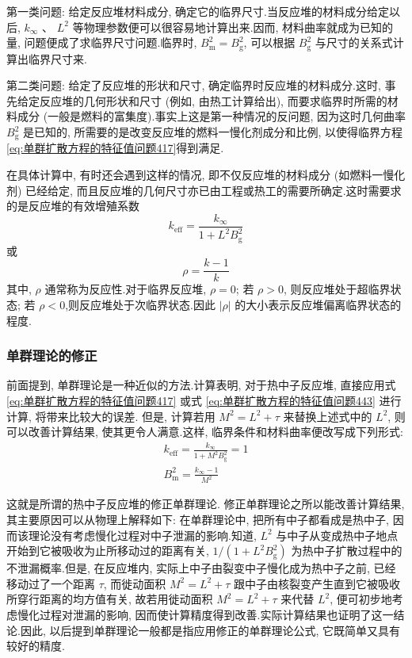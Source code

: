 \documentclass{Sichuan Normal University}
\begin{document}
第一类问题: 给定反应堆材料成分, 确定它的临界尺寸.当反应堆的材料成分给定以后, $k_{\infty}$ 、 $L^2$ 等物理参数便可以很容易地计算出来.因而, 材料曲率就成为已知的量, 问题便成了求临界尺寸问题.临界时, $B_{\mathrm{m}}^2=B_{\mathrm{g}}^2$, 可以根据 $B_{\mathrm{g}}^2$ 与尺寸的关系式计算出临界尺寸来.

第二类问题: 给定了反应堆的形状和尺寸, 确定临界时反应堆的材料成分.这时, 事先给定反应堆的几何形状和尺寸 (例如, 由热工计算给出), 而要求临界时所需的材料成分 (一般是燃料的富集度).事实上这是第一种情况的反问题, 因为这时几何曲率 $B_{\mathrm{g}}^2$ 是已知的, 所需要的是改变反应堆的燃料一慢化剂成分和比例, 以使得临界方程 \eqref{eq:单群扩散方程的特征值问题417}得到满足.

在具体计算中, 有时还会遇到这样的情况, 即不仅反应堆的材料成分 (如燃料一慢化剂) 已经给定, 而且反应堆的几何尺寸亦已由工程或热工的需要所确定.这时需要求的是反应堆的有效增殖系数
\begin{equation}
k_{\mathrm{eff}}=\frac{k_{\infty}}{1+L^2 B_{\mathrm{g}}^2}
\end{equation}
或
\begin{equation}
\rho=\frac{k-1}{k}
\end{equation}
其中, $\rho$ 通常称为反应性.对于临界反应堆, $\rho=0$; 若 $\rho>0$, 则反应堆处于超临界状态; 若 $\rho<0$,则反应堆处于次临界状态.因此 $|\rho|$ 的大小表示反应堆偏离临界状态的程度.
\subsubsection{单群理论的修正}
前面提到, 单群理论是一种近似的方法.计算表明, 对于热中子反应堆, 直接应用式 \eqref{eq:单群扩散方程的特征值问题417} 或式 \eqref{eq:单群扩散方程的特征值问题443} 进行计算, 将带来比较大的误差.
但是, 计算若用 $M^2=L^2+\tau$ 来替换上述式中的 $L^2$, 则可以改善计算结果, 使其更令人满意.这样, 临界条件和材料曲率便改写成下列形式:
\begin{equation}
\begin{gathered}
k_{\mathrm{eff}}=\frac{k_{\infty}}{1+M^2 B_{\mathrm{g}}^2}=1 \\
B_{\mathrm{m}}^2=\frac{k_{\infty}-1}{M^2}
\end{gathered}
\end{equation}

这就是所谓的热中子反应堆的修正单群理论.
修正单群理论之所以能改善计算结果, 其主要原因可以从物理上解释如下: 在单群理论中, 把所有中子都看成是热中子, 因而该理论没有考虑慢化过程对中子泄漏的影响.知道, $L^2$ 与中子从变成热中子地点开始到它被吸收为止所移动过的距离有关, $1 /\left(1+L^2 B_{\mathrm{g}}^2\right)$ 为热中子扩散过程中的不泄漏概率.但是, 在反应堆内, 实际上中子由裂变中子慢化成为热中子之前, 已经移动过了一个距离 $\tau$, 而徙动面积 $M^2=L^2+\tau$ 跟中子由核裂变产生直到它被吸收所穿行距离的均方值有关, 故若用徙动面积 $M^2=L^2+\tau$ 来代替 $L^2$, 便可初步地考虑慢化过程对泄漏的影响, 因而使计算精度得到改善.实际计算结果也证明了这一结论.因此, 以后提到单群理论一般都是指应用修正的单群理论公式, 它既简单又具有较好的精度.
\end{document}
